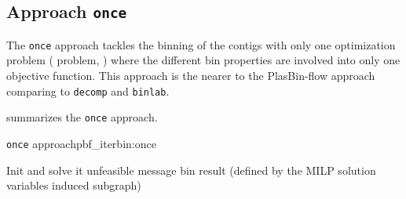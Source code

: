 \subsection{Approach \texttt{once}}\label{sec:pbf_iterbin:once}

The \texttt{once} approach tackles the binning of the contigs with only one optimization problem (\MGCLB{} problem, ) where the different bin properties are involved into only one objective function.
This approach is the nearer to the PlasBin-flow approach comparing to \texttt{decomp} and \texttt{binlab}.

 summarizes the \texttt{once} approach.

\begin{tcbalgo}{\texttt{once} approach}{pbf_iterbin:once}
  \begin{algorithmic}[1]
    \State{} Init \MGCLB{} and solve it
    \State{} \Return{}unfeasible message
    \EndIf{}
    \State{} \Return{}\MGCLB{} bin result (defined by the MILP solution variables induced subgraph)
    \EndFunction{}
  \end{algorithmic}
\end{tcbalgo}

